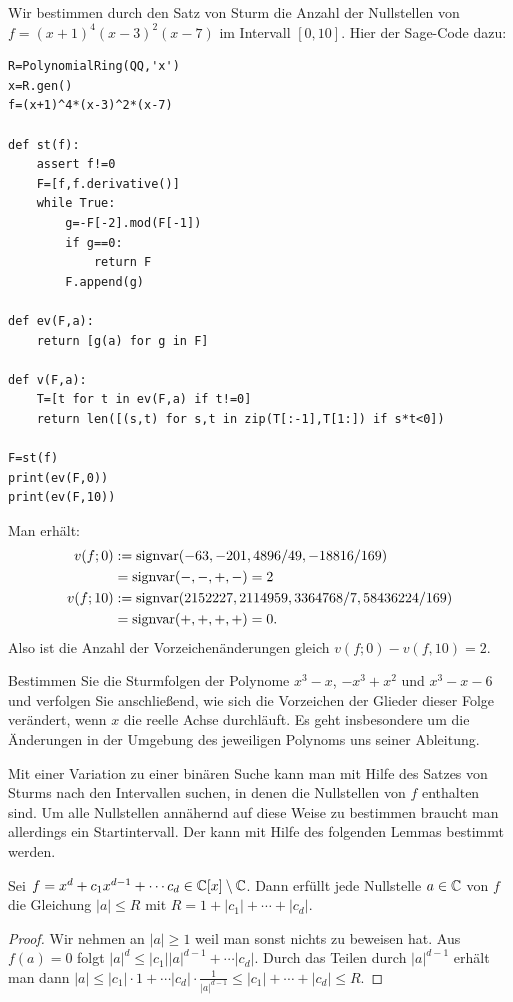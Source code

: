 \documentclass[11pt]{article}
\numberwithin{equation}{section}
\begin{document}
\begin{beispiel}
	Wir bestimmen durch den Satz von Sturm die Anzahl der Nullstellen von $f = (x+1)^4 (x-3)^2 (x-7)$ im Intervall $[0,10]$. Hier der Sage-Code dazu: 
\begin{lstlisting}
R=PolynomialRing(QQ,'x')
x=R.gen()
f=(x+1)^4*(x-3)^2*(x-7)

def st(f):
	assert f!=0
	F=[f,f.derivative()]
	while True:
		g=-F[-2].mod(F[-1])
		if g==0: 
			return F
		F.append(g)

def ev(F,a):
	return [g(a) for g in F]

def v(F,a):
	T=[t for t in ev(F,a) if t!=0]
	return len([(s,t) for s,t in zip(T[:-1],T[1:]) if s*t<0])

F=st(f)
print(ev(F,0))
print(ev(F,10))
\end{lstlisting} 
Man erhält: 
\begin{align*}
		v(f;0) & := \operatorname{signvar}(-63, -201, 4896/49, -18816/169)
			\\ & = \operatorname{signvar}(-,-,+,-) = 2
\\		v(f;10) & := \operatorname{signvar}(2152227, 2114959, 3364768/7, 58436224/169)
\\ & = \operatorname{signvar}(+,+,+,+) = 0. 
\end{align*} 
Also ist die Anzahl der Vorzeichenänderungen gleich $v(f;0)-v(f,10) = 2$. 
\end{beispiel} 

\begin{aufgabe} 
	Bestimmen Sie die Sturmfolgen der Polynome $x^3 - x$, $-x^3 + x^2$ und $x^3-x-6$ und verfolgen Sie anschließend, wie sich die Vorzeichen der Glieder dieser Folge verändert, wenn $x$ die reelle Achse durchläuft. Es geht insbesondere um die Änderungen in der Umgebung des jeweiligen Polynoms uns seiner Ableitung. 
\end{aufgabe} 

\begin{remark} 
	Mit einer Variation zu einer binären Suche kann man mit Hilfe des Satzes von Sturms nach den Intervallen suchen, in denen die Nullstellen von $f$ enthalten sind. Um alle Nullstellen annähernd auf diese Weise zu bestimmen braucht man allerdings ein Startintervall. Der kann mit Hilfe des folgenden Lemmas bestimmt werden. 
\end{remark} 

\begin{lemma} \label{R:lem} 
	Sei $f = x^d + c_1 x^{d-1} + \cdots c_d\in \mathbb{C}[x] \setminus \mathbb{C}$. Dann erfüllt jede Nullstelle $a \in \mathbb{C}$ von $f$ die Gleichung 
	$|a| \le R$ mit $R = 1 + |c_1| + \cdots + |c_d|$.
\end{lemma} 
\begin{proof} 
	Wir nehmen an $|a|\ge 1$ weil man sonst nichts zu beweisen hat. Aus $f(a) =0$ folgt 
	$|a|^d \le  |c_1|   |a|^{d-1} + \cdots |c_d|$. Durch das Teilen durch $|a|^{d-1}$ erhält man dann 
	$|a| \le |c_1| \cdot 1 + \cdots |c_d| \cdot \frac{1}{|a|^{d-1}} \le |c_1| + \cdots + |c_d| \le R$.  
\end{proof} 
\end{document}
